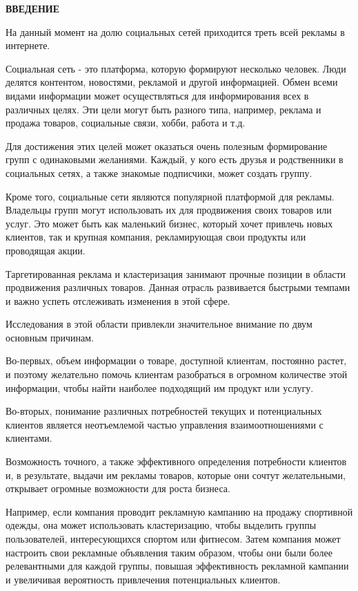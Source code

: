 \begin{center}
	\bfseries\fontsize{16}{19}\selectfont ВВЕДЕНИЕ
\end{center}

На данный момент на долю социальных сетей приходится треть всей рекламы в интернете. 

Социальная сеть - это платформа, которую формируют несколько человек. Люди делятся контентом, новостями, рекламой и другой информацией. Обмен всеми видами информации может осуществляться для информирования всех в различных целях. Эти цели могут быть разного типа, например, реклама и продажа товаров, социальные связи, хобби, работа и т.д. 

Для достижения этих целей может оказаться очень полезным формирование групп с одинаковыми желаниями. Каждый, у кого есть друзья и родственники в социальных сетях, а также знакомые подписчики, может создать группу.

Кроме того, социальные сети являются популярной платформой для рекламы. Владельцы групп могут использовать их для продвижения своих товаров или услуг. Это может быть как маленький бизнес, который хочет привлечь новых клиентов, так и крупная компания, рекламирующая свои продукты или проводящая акции.

Таргетированная реклама и кластеризация занимают прочные позиции в области продвижения различных товаров. Данная отрасль развивается быстрыми темпами и важно успеть отслеживать изменения в этой сфере.

Исследования в этой области привлекли значительное внимание по двум основным причинам. 

Во-первых, объем информации о товаре, доступной клиентам, постоянно растет, и поэтому желательно помочь клиентам разобраться в огромном количестве этой информации, чтобы найти наиболее подходящий им продукт или услугу. 

Во-вторых, понимание различных потребностей текущих и потенциальных клиентов является неотъемлемой частью управления взаимоотношениями с клиентами.

Возможность точного, а также эффективного определения потребности клиентов и, в результате, выдачи им рекламы товаров, которые они сочтут желательными, открывает огромные возможности для роста бизнеса.

Например, если компания проводит рекламную кампанию на продажу спортивной одежды, она может использовать кластеризацию, чтобы выделить группы пользователей, интересующихся спортом или фитнесом. Затем компания может настроить свои рекламные объявления таким образом, чтобы они были более релевантными для каждой группы, повышая эффективность рекламной кампании и увеличивая вероятность привлечения потенциальных клиентов.

